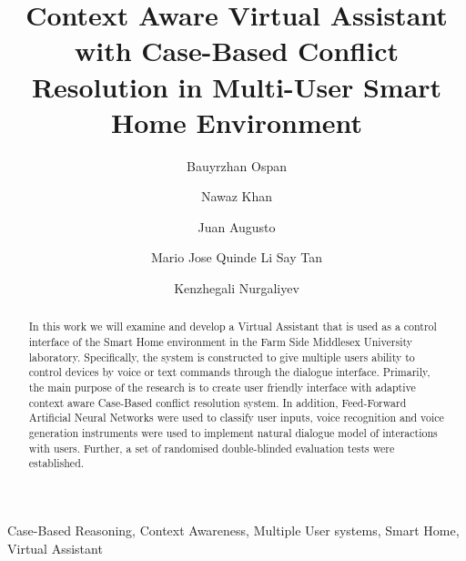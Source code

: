 \documentclass{llncs}
\begin{document}
    \title{Context Aware Virtual Assistant with
    Case-Based Conflict Resolution in
    Multi-User Smart Home Environment}
    \author{Bauyrzhan Ospan \and Nawaz Khan  \and Juan Augusto  \and Mario Jose Quinde Li Say Tan  \and Kenzhegali Nurgaliyev }
    \maketitle
    \begin{abstract}
        In this work we will examine and develop a Virtual Assistant that is used as a control
        interface of the Smart Home environment in the Farm Side Middlesex University laboratory.
        Specifically, the system is
        constructed to give multiple users ability to control devices by voice or text commands through the dialogue
        interface.
        Primarily, the main purpose of the research is to create user friendly interface with adaptive context aware
        Case-Based conflict resolution system.
        In addition, Feed-Forward Artificial Neural Networks were used to classify user inputs, voice
        recognition and voice generation instruments were used to implement natural dialogue model of interactions with users.
        Further, a set of randomised double-blinded
        evaluation tests were established.
    \end{abstract}
    \begin{keywords}
        Case-Based Reasoning, Context Awareness, Multiple User systems, Smart Home, Virtual Assistant
    \end{keywords}
\end{document}
